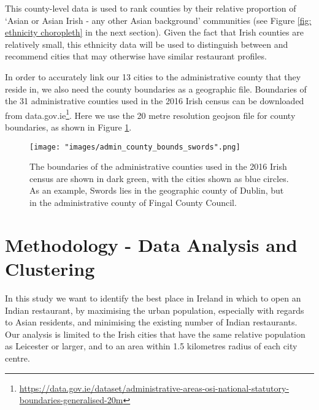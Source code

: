 \documentclass[a4paper,11pt]{article}
\begin{document}
This county-level data is used to rank counties by their relative proportion of `Asian or Asian Irish - any other Asian background' communities (see Figure \ref{fig: ethnicity choropleth} in the next section). Given the fact that Irish counties are relatively small, this ethnicity data will be used to distinguish between and recommend cities that may otherwise have similar restaurant profiles. 


In order to accurately link our 13 cities to the administrative county that they reside in, we also need the county boundaries as a geographic file. Boundaries of the 31 administrative counties used in the 2016 Irish census can be downloaded from data.gov.ie\footnote{\url{https://data.gov.ie/dataset/administrative-areas-osi-national-statutory-boundaries-generalised-20m}}. Here we use the 20 metre resolution geojson file for county boundaries, as shown in Figure \ref{fig:admin counties}.
%
\begin{figure}[htb]
   \centering
   \texttt{[image: "images/admin\_county\_bounds\_swords".png]}
      \caption{The boundaries of the administrative counties used in the 2016 Irish census are shown in dark green, with the cities shown as blue circles. As an example, Swords lies in the geographic county of Dublin, but in the administrative county of Fingal County Council.}
      \label{fig:admin counties}
\end{figure}
%   

\section{Methodology - Data Analysis and Clustering}
In this study we want to identify the best place in Ireland in which to open an Indian restaurant, by maximising the urban population, especially with regards to Asian residents, and minimising the existing number of Indian restaurants. Our analysis is limited to the Irish cities that have the same relative population as Leicester or larger, and to an area within 1.5 kilometres radius of each city centre.
\end{document}
